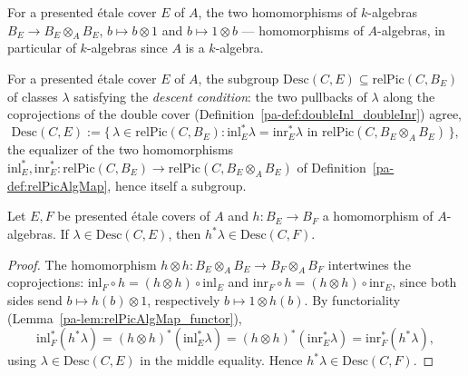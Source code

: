 \begin{definition}
  \label{pa-def:doubleInl_doubleInr}
  \leanok

  For a presented \'etale cover \(E\) of \(A\), the two homomorphisms of \(k\)-algebras
  \(B_E \to B_E \otimes_A B_E\), \(b \mapsto b \otimes 1\) and \(b \mapsto 1 \otimes b\) ---
  homomorphisms of \(A\)-algebras, in particular of \(k\)-algebras since \(A\) is a
  \(k\)-algebra.
\end{definition}

\begin{definition}
  \label{pa-def:descentClasses}
  \leanok

  For a presented \'etale cover \(E\) of \(A\), the subgroup
  \(\mathrm{Desc}(C,E) \subseteq \mathrm{relPic}(C,B_E)\) of classes \(\lambda\) satisfying the
  \emph{descent condition}: the two pullbacks of \(\lambda\) along the coprojections of the
  double cover (Definition~\ref{pa-def:doubleInl_doubleInr}) agree,
  \[
    \mathrm{Desc}(C,E) := \bigl\{\, \lambda \in \mathrm{relPic}(C,B_E) : \mathrm{inl}_E^{*}
    \lambda = \mathrm{inr}_E^{*} \lambda \text{ in } \mathrm{relPic}(C, B_E \otimes_A B_E)
    \,\bigr\},
  \]
  the equalizer of the two homomorphisms \(\mathrm{inl}_E^{*}, \mathrm{inr}_E^{*} \colon
  \mathrm{relPic}(C,B_E) \to \mathrm{relPic}(C, B_E \otimes_A B_E)\) of
  Definition~\ref{pa-def:relPicAlgMap}, hence itself a subgroup.
\end{definition}

\begin{lemma}
  \label{pa-lem:relPicAlgMap_mem_descentClasses}
  \leanok

  Let \(E, F\) be presented \'etale covers of \(A\) and \(h \colon B_E \to B_F\) a
  homomorphism of \(A\)-algebras. If \(\lambda \in \mathrm{Desc}(C,E)\), then
  \(h^{*}\lambda \in \mathrm{Desc}(C,F)\).
\end{lemma}
\begin{proof}
  \leanok
  The homomorphism \(h \otimes h \colon B_E \otimes_A B_E \to B_F \otimes_A B_F\) intertwines
  the coprojections: \(\mathrm{inl}_F \circ h = (h \otimes h) \circ \mathrm{inl}_E\) and
  \(\mathrm{inr}_F \circ h = (h \otimes h) \circ \mathrm{inr}_E\), since both sides send
  \(b \mapsto h(b) \otimes 1\), respectively \(b \mapsto 1 \otimes h(b)\). By functoriality
  (Lemma~\ref{pa-lem:relPicAlgMap_functor}),
  \[
    \mathrm{inl}_F^{*}(h^{*}\lambda) = (h \otimes h)^{*}(\mathrm{inl}_E^{*}\lambda)
    = (h \otimes h)^{*}(\mathrm{inr}_E^{*}\lambda) = \mathrm{inr}_F^{*}(h^{*}\lambda),
  \]
  using \(\lambda \in \mathrm{Desc}(C,E)\) in the middle equality. Hence
  \(h^{*}\lambda \in \mathrm{Desc}(C,F)\).
\end{proof}

